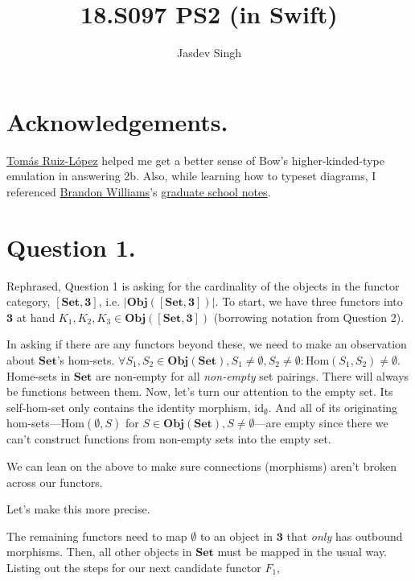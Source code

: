 \documentclass{article}
\title{18.S097 PS2 (in Swift)}
\author{Jasdev Singh}
\begin{document}
\maketitle

\section*{Acknowledgements.}

\href{https://twitter.com/tomasruizlopez}{Tomás Ruiz-López} helped me get a better sense of Bow’s higher-kinded-type emulation in answering 2b. Also, while learning how to typeset diagrams, I referenced \href{https://twitter.com/mbrandonw}{Brandon Williams}’s \href{https://github.com/mbrandonw/my-math-notes}{graduate school notes}.

\section*{Question 1.}

Rephrased, Question 1 is asking for the cardinality of the objects in the functor category, $[\textbf{Set}, \textbf{3}]$, i.e. $|\textbf{Obj}([\textbf{Set}, \textbf{3}])|$. To start, we have three functors into $\textbf{3}$ at hand $K_1, K_2, K_3 \in \textbf{Obj}([\textbf{Set}, \textbf{3}])$ (borrowing notation from Question 2).

In asking if there are any functors beyond these, we need to make an observation about $\textbf{Set}$’s hom-sets. $\forall S_1, S_2 \in \textbf{Obj}(\textbf{Set}), S_1 \neq \emptyset, S_2 \neq \emptyset: \textrm{Hom}(S_1, S_2) \neq \emptyset$. Home-sets in $\textbf{Set}$ are non-empty for all \textit{non-empty} set pairings. There will always be functions between them.
Now, let's turn our attention to the empty set. Its self-hom-set only contains the identity morphism, $\textrm{id}_{\emptyset}$. And all of its originating hom-sets—$\textrm{Hom}(\emptyset, S)$ for $S \in \textbf{Obj}(\textbf{Set}), S \neq \emptyset$—are empty since there we can’t construct functions from non-empty sets into the empty set.

We can lean on the above to make sure connections (morphisms) aren’t broken across our functors.

Let’s make this more precise.

The remaining functors need to map $\emptyset$ to an object in $\textbf{3}$ that \textit{only} has outbound morphisms. Then, all other objects in $\textbf{Set}$ must be mapped in the usual way. Listing out the steps for our next candidate functor $F_1$,
\end{document}

